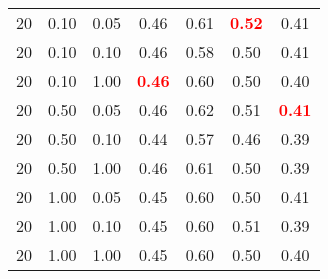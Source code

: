 \begin{tabular}{lllcccc}
20 & 0.10 & 0.05 & 0.46 & 0.61 & \textbf{\textcolor{red}{0.52}} & 0.41 \\ 
20 & 0.10 & 0.10 & 0.46 & 0.58 & 0.50 & 0.41 \\ 
20 & 0.10 & 1.00 & \textbf{\textcolor{red}{0.46}} & 0.60 & 0.50 & 0.40 \\ 
20 & 0.50 & 0.05 & 0.46 & 0.62 & 0.51 & \textbf{\textcolor{red}{0.41}} \\ 
20 & 0.50 & 0.10 & 0.44 & 0.57 & 0.46 & 0.39 \\ 
20 & 0.50 & 1.00 & 0.46 & 0.61 & 0.50 & 0.39 \\ 
20 & 1.00 & 0.05 & 0.45 & 0.60 & 0.50 & 0.41 \\ 
20 & 1.00 & 0.10 & 0.45 & 0.60 & 0.51 & 0.39 \\ 
20 & 1.00 & 1.00 & 0.45 & 0.60 & 0.50 & 0.40 \\ 
\end{tabular} 
